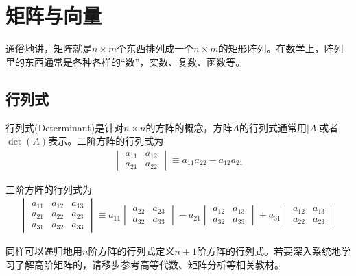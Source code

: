 
\chapter{矩阵与向量}
\label{chap:matrix}

通俗地讲，矩阵就是$n\times m$个东西排列成一个$n\times m$的矩形阵列。在数学上，阵列里的东西通常是各种各样的“数”，实数、复数、函数等。

\section{行列式}
\label{sec:determinant}

行列式(Determinant)是针对$n\times n$的方阵的概念，方阵$A$的行列式通常用$\left| A\right|$或者$\det(A)$表示。二阶方阵的行列式为
\begin{align*}
  \begin{vmatrix}
    a_{11} & a_{12}\\
    a_{21} & a_{22}
  \end{vmatrix}
             \equiv a_{11}a_{22} - a_{12}a_{21}
\end{align*}

三阶方阵的行列式为
\begin{align*}
  \begin{vmatrix}
    a_{11} & a_{12} & a_{13}\\
    a_{21} & a_{22} & a_{23}\\
    a_{31} & a_{32} & a_{33}
  \end{vmatrix}\equiv
   a_{11}\begin{vmatrix} a_{22} & a_{23}\\ a_{32} & a_{33} \end{vmatrix}
  -a_{21}\begin{vmatrix} a_{12} & a_{13}\\ a_{32} & a_{33} \end{vmatrix}
  +a_{31}\begin{vmatrix} a_{12} & a_{13}\\ a_{22} & a_{23} \end{vmatrix}
\end{align*}

同样可以递归地用$n$阶方阵的行列式定义$n+1$阶方阵的行列式。若要深入系统地学习了解高阶矩阵的，请移步参考高等代数、矩阵分析等相关教材。

